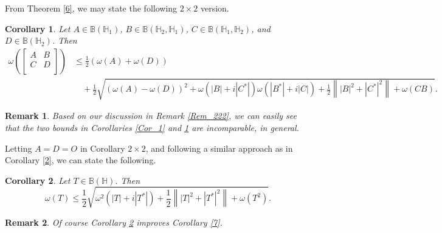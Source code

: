 \documentclass[12pt,twoside,reqno]{amsart}
\newtheorem{remark}{Remark}[section]
\newtheorem{corollary}{Corollary}[section]
\numberwithin{equation}{section}
\begin{document}
\color{black}
From Theorem \ref{6}, we may state the following $2\times 2$ version. 
\begin{corollary}\label{Cor_2}
Let $A\in \mathbb B\left( {{\mathbb H}_{1}} \right)$, $B\in \mathbb B\left( {{\mathbb H}_{2}},{{\mathbb H}_{1}} \right)$, $C\in \mathbb B\left( {{\mathbb H}_{1}},{{\mathbb H}_{2}} \right)$, and $D\in \mathbb B\left( {{\mathbb H}_{2}} \right)$. Then
{\small
\[\begin{aligned}
   \omega \left( \left[ \begin{matrix}
   A & B  \\
   C & D  \\
\end{matrix} \right] \right)&\le \frac{1}{2}\left( \omega \left( A \right)+\omega \left( D \right) \right) \\ 
 &\quad +\frac{1}{2}\sqrt{{{\left( \omega \left( A \right)-\omega \left( D \right) \right)}^{2}}+\omega \left( \left| B \right|+i\left| {{C}^{*}} \right| \right)\omega \left( \left| {{B}^{*}} \right|+i\left| C \right| \right)+\frac{1}{2}\left\| {{\left| B \right|}^{2}}+{{\left| {{C}^{*}} \right|}^{2}} \right\|+\omega \left( CB \right)}.  
\end{aligned}\]}
\end{corollary}
\begin{remark}
Based on our discussion in Remark \ref{Rem_222}, we can easily see that the two bounds in Corollaries \ref{Cor_1} and \ref{Cor_2} are incomparable, in general.
\end{remark}

Letting $A=D=O$ in Corollary $2\times 2$, and following a similar approach as in Corollary \ref{2}, we can state the following.
\begin{corollary}\label{8}
Let $T\in \mathbb B\left( {{\mathbb H}} \right)$. Then
\[\omega \left( T \right)\le \frac{1}{2}\sqrt{{{\omega }^{2}}\left( \left| T \right|+i\left| {{T}^{*}} \right| \right)+\frac{1}{2}\left\| {{\left| T \right|}^{2}}+{{\left| {{T}^{*}} \right|}^{2}} \right\|+\omega \left( {{T}^{2}} \right)}.\]
\end{corollary}



\begin{remark}
Of course Corollary \ref{8} improves Corollary \ref{7}.
\end{remark}
\end{document}
